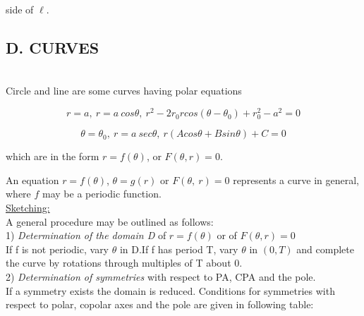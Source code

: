 \documentclass[11pt]{amsbook}
\begin{document}
    
    \begin{flushleft}
    side of $\ell$.
    \end{flushleft}

    \subsection*{D. CURVES} \hfill\\
    
    Circle and line are some curves having polar equations
    
    \begin{equation*}
         r=a,\ r=a\ cos\theta,\ r^2 -2r_{0}r cos(\theta-\theta_{0}) + r_{0}^2 -a^2=0
    \end{equation*}
    
    \begin{equation*}
        \theta = \theta_{0},\ r=a\ sec\theta,\ r(Acos\theta + Bsin\theta) + C =0
    \end{equation*}
    
    \hfill
    
    \begin{flushleft}
    which are in the form $r=f(\theta)$, or $F(\theta,r)=0$.
    \end{flushleft}
    
    \hfill
    
    An equation $r=f(\theta)$, $\theta=g(r)$ or $F(\theta,\ r)=0$ represents a curve in general, where $f$ may be a periodic function. \\
    
    \underline{Sketching:} \\
    
    A general procedure may be outlined as follows: \\
    
    1) \emph{Determination of the domain D} of $r=f(\theta)$ or of $F(\theta,r)=0$ \\
    
    If f is not periodic, vary $\theta$ in D.If f has period T, vary $\theta$ in $(0, T)$ and complete the curve by rotations through multiples of T about 0. \\
    
    2) \emph{Determination of symmetries} with respect to PA, CPA and the pole. \\
    
    If a symmetry exists the domain is reduced. Conditions for symmetries with respect to polar, copolar axes and the pole are given in following table:
    
\end{document}
